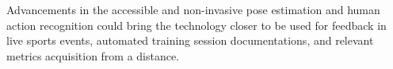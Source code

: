 Advancements in the accessible and non-invasive pose estimation and human action recognition could bring the technology closer to be used for feedback in live sports events, automated training session documentations, and relevant metrics acquisition from a distance.










